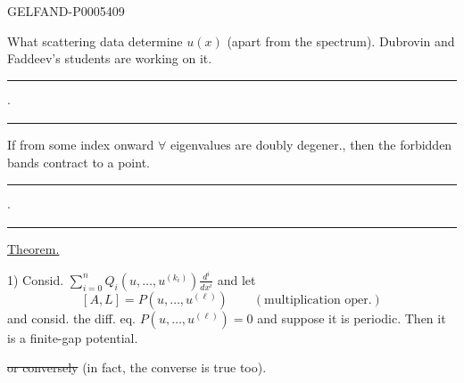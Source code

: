 \begin{GelfandAdjacentEvidence}{GELFAND-P000540}{9}


What scattering data determine \(u(x)\) (apart from the spectrum). Dubrovin and Faddeev’s students are working on it.
\hfill\rule{1.08cm}{.35pt}\enspace\(\cdot\)\enspace\rule{1.08cm}{.35pt}\par

If from some index onward \(\forall\) eigenvalues are doubly degener., then the forbidden bands contract to a point.
\hfill\rule{1.08cm}{.35pt}\enspace\(\cdot\)\enspace\rule{1.08cm}{.35pt}\par

\uline{Theorem.}

1) Consid. \(\displaystyle\sum_{i=0}^n Q_i(u,\ldots,u^{(k_i)})\frac{d^i}{dx^i}\) and let
\[
[A,L]=P(u,\ldots,u^{(\ell)})\qquad(\text{multiplication oper.})
\]
and consid. the diff. eq. \(P(u,\ldots,u^{(\ell)})=0\) and suppose it is periodic.
Then it is a finite-gap potential.

\sout{or conversely} (in fact, the converse is true too).
\end{GelfandAdjacentEvidence}



